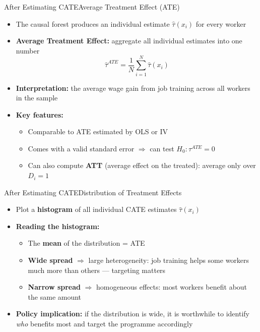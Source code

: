 \documentclass[dvipsnames,hyperref={pdfpagelabels=false}]{beamer}
\begin{document}
\begin{frame}{After Estimating CATE}{Average Treatment Effect (ATE)}
\begin{itemize}
	\item The causal forest produces an individual estimate $\hat{\tau}(x_i)$ for every worker
	\vspace{0.3cm}
	\item \textbf{Average Treatment Effect:} aggregate all individual estimates into one number
	\[
		\hat{\tau}^{ATE} = \frac{1}{N}\sum_{i=1}^{N}\hat{\tau}(x_i)
	\]
	\vspace{0.1cm}
	\item \textbf{Interpretation:} the average wage gain from job training across all workers in the sample
	\vspace{0.3cm}
	\item \textbf{Key features:}
	\vspace{0.1cm}
	\begin{itemize}
		\item Comparable to ATE estimated by OLS or IV
		\vspace{0.15cm}
		\item Comes with a valid standard error $\Rightarrow$ can test $H_0: \tau^{ATE} = 0$
		\vspace{0.15cm}
		\item Can also compute \textbf{ATT} (average effect on the treated): average only over $D_i = 1$
	\end{itemize}
\end{itemize}
\end{frame}




\begin{frame}{After Estimating CATE}{Distribution of Treatment Effects}
\begin{itemize}
	\item Plot a \textbf{histogram} of all individual CATE estimates $\hat{\tau}(x_i)$
	\vspace{0.3cm}
	\item \textbf{Reading the histogram:}
	\vspace{0.1cm}
	\begin{itemize}
		\item The \textbf{mean} of the distribution = ATE
		\vspace{0.15cm}
		\item \textbf{Wide spread} $\Rightarrow$ large heterogeneity: job training helps some workers much more than others --- targeting matters
		\vspace{0.15cm}
		\item \textbf{Narrow spread} $\Rightarrow$ homogeneous effects: most workers benefit about the same amount
	\end{itemize}
	\vspace{0.3cm}
	\item \textbf{Policy implication:} if the distribution is wide, it is worthwhile to identify \textit{who} benefits most and target the programme accordingly
\end{itemize}
\end{frame}
\end{document}
